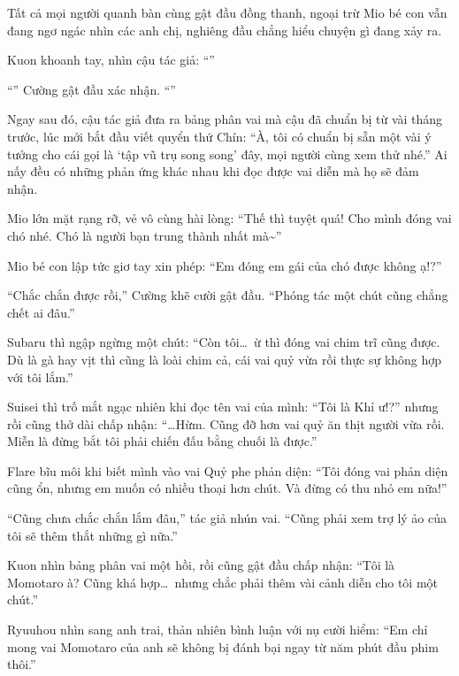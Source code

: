 \documentclass[../main.tex]{subfiles}
\begin{document}
Tất cả mọi người quanh bàn cùng gật đầu đồng thanh, ngoại trừ Mio bé con vẫn đang ngơ ngác nhìn các anh chị, nghiêng đầu chẳng hiểu chuyện gì đang xảy ra.

Kuon khoanh tay, nhìn cậu tác giả: ``''

``'' Cường gật đầu xác nhận. ``''

Ngay sau đó, cậu tác giả đưa ra bảng phân vai mà cậu đã chuẩn bị từ vài tháng trước, lúc mới bắt đầu viết quyển thứ Chín: ``À, tôi có chuẩn bị sẵn một vài ý tưởng cho cái gọi là `tập vũ trụ song song' đây, mọi người cùng xem thử nhé.'' Ai nấy đều có những phản ứng khác nhau khi đọc được vai diễn mà họ sẽ đảm nhận.

Mio lớn mặt rạng rỡ, vẻ vô cùng hài lòng: ``Thế thì tuyệt quá! Cho mình đóng vai chó nhé. Chó là người bạn trung thành nhất mà\~{}''

Mio bé con lập tức giơ tay xin phép: ``Em đóng em gái của chó được không ạ!?''

``Chắc chắn được rồi,'' Cường khẽ cười gật đầu. ``Phóng tác một chút cũng chẳng chết ai đâu.''

Subaru thì ngập ngừng một chút: ``Còn tôi\dots\ ừ thì đóng vai chim trĩ cũng được. Dù là gà hay vịt thì cũng là loài chim cả, cái vai quỷ vừa rồi thực sự không hợp với tôi lắm.''

Suisei thì trố mắt ngạc nhiên khi đọc tên vai của mình: ``Tôi là Khỉ ư!?'' nhưng rồi cũng thở dài chấp nhận: ``\dots Hừm. Cũng đỡ hơn vai quỷ ăn thịt người vừa rồi. Miễn là đừng bắt tôi phải chiến đấu bằng chuối là được.''

Flare bĩu môi khi biết mình vào vai Quỷ phe phản diện: ``Tôi đóng vai phản diện cũng ổn, nhưng em muốn có nhiều thoại hơn chút. Và đừng có thu nhỏ em nữa!''

``Cũng chưa chắc chắn lắm đâu,'' tác giả nhún vai. ``Cũng phải xem trợ lý ảo của tôi sẽ thêm thắt những gì nữa.''

Kuon nhìn bảng phân vai một hồi, rồi cũng gật đầu chấp nhận: ``Tôi là Momotaro à? Cũng khá hợp\dots\ nhưng chắc phải thêm vài cảnh diễn cho tôi một chút.''

Ryuuhou nhìn sang anh trai, thản nhiên bình luận với nụ cười hiểm: ``Em chỉ mong vai Momotaro của anh sẽ không bị đánh bại ngay từ năm phút đầu phim thôi.''
\end{document}
